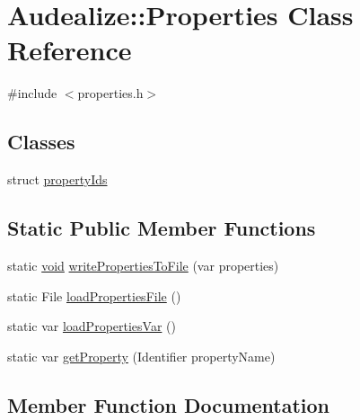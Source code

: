\hypertarget{class_audealize_1_1_properties}{}\section{Audealize\+:\+:Properties Class Reference}
\label{class_audealize_1_1_properties}


{\ttfamily \#include $<$properties.\+h$>$}

\subsection*{Classes}
\begin{DoxyCompactItemize}
\item 
struct \hyperlink{struct_audealize_1_1_properties_1_1property_ids}{property\+Ids}
\end{DoxyCompactItemize}
\subsection*{Static Public Member Functions}
\begin{DoxyCompactItemize}
\item 
static \hyperlink{tk_8h_aba408b7cd755a96426e004c015f5de8e}{void} \hyperlink{class_audealize_1_1_properties_a5fd61e0b3e2ef18813404e5780dc6682}{write\+Properties\+To\+File} (var properties)
\item 
static File \hyperlink{class_audealize_1_1_properties_a834a6e7a3141abe29d9efac85607e084}{load\+Properties\+File} ()
\item 
static var \hyperlink{class_audealize_1_1_properties_afdb11258af4ee48a91d244e6a9cdc6e0}{load\+Properties\+Var} ()
\item 
static var \hyperlink{class_audealize_1_1_properties_a19a50c0d4e45ac5577d15df31b4b7786}{get\+Property} (Identifier property\+Name)
\end{DoxyCompactItemize}


\subsection{Member Function Documentation}
